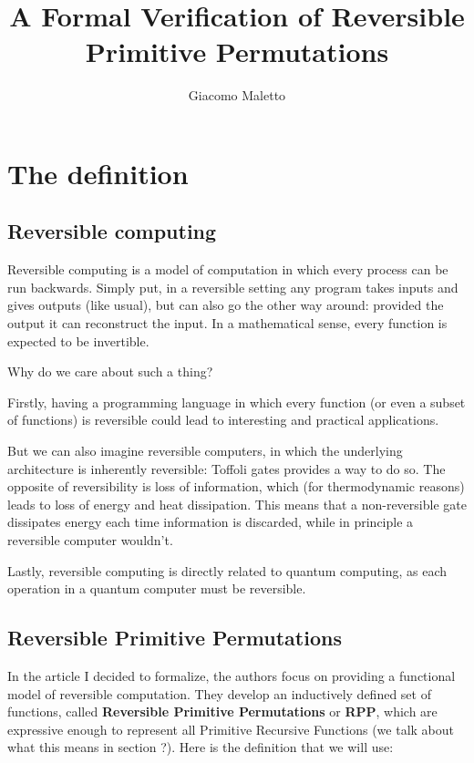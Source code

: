 \documentclass{book}
\title{A Formal Verification of Reversible Primitive Permutations}
\author{Giacomo Maletto}
\date{}
\theoremstyle{definition}
\theoremstyle{remark}
\theoremstyle{plain}
\begin{document}
\maketitle

\chapter{The definition}

\section{Reversible computing}

Reversible computing is a model of computation in which every process can be run backwards.
Simply put, in a reversible setting any program takes inputs and gives outputs (like usual), but can also go the other way around:
provided the output it can reconstruct the input.
In a mathematical sense, every function is expected to be invertible.

Why do we care about such a thing?

Firstly, having a programming language in which every function (or even a subset of functions) is reversible could lead to interesting and practical applications.

But we can also imagine reversible computers, in which the underlying architecture is inherently reversible:
Toffoli gates provides a way to do so.
The opposite of reversibility is loss of information, which (for thermodynamic reasons) leads to loss of energy and heat dissipation.
This means that a non-reversible gate dissipates energy each time information is discarded, while in principle a reversible computer wouldn't.

Lastly, reversible computing is directly related to quantum computing, as each operation in a quantum computer must be reversible.


\section{Reversible Primitive Permutations}

In the article I decided to formalize, the authors focus on providing a functional model of reversible computation.
They develop an inductively defined set of functions, called \textbf{Reversible Primitive Permutations} or \textbf{RPP},
which are expressive enough to represent all Primitive Recursive Functions (we talk about what this means in section ?).
Here is the definition that we will use:
\end{document}
